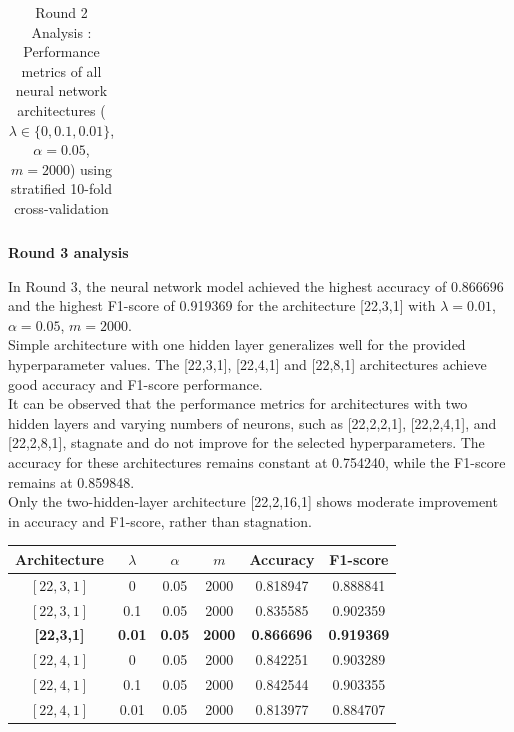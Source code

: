 \documentclass{article}
\begin{document}
\begin{enumerate}
\begin{table}[H]
\begin{tabular}{|c|c|c|c|c|c|}
\end{tabular}

\caption{Round 2 Analysis : Performance metrics of all neural network architectures ($\lambda \in \{0, 0.1, 0.01\}$, $\alpha = 0.05$, $m = 2000$) using stratified 10-fold cross-validation}
\end{table}



\textbf{Round 3 analysis}

In Round 3, the neural network model achieved the highest accuracy of 0.866696 and the highest F1-score of 0.919369 for the architecture [22,3,1] with $\lambda = 0.01$, $\alpha = 0.05$, $m = 2000$. \\

Simple architecture with one hidden layer generalizes well for the provided hyperparameter values. The [22,3,1], [22,4,1] and [22,8,1] architectures achieve good accuracy and F1-score performance.\\

It can be observed that the performance metrics for architectures with two hidden layers and varying numbers of neurons, such as [22,2,2,1], [22,2,4,1], and [22,2,8,1], stagnate and do not improve for the selected hyperparameters. The accuracy for these architectures remains constant at 0.754240, while the F1-score remains at 0.859848.\\

Only the two-hidden-layer architecture [22,2,16,1] shows moderate improvement in accuracy and F1-score, rather than stagnation.


\begin{table}[H]
\centering
\large
\renewcommand{\arraystretch}{1.2}
\setlength{\tabcolsep}{6pt}

\begin{tabular}{|c|c|c|c|c|c|}
\hline
\textbf{Architecture} & \textbf{$\lambda$} & \textbf{$\alpha$} & \textbf{$m$} & \textbf{Accuracy} & \textbf{F1-score} \\
\hline

$[22,3,1]$ & 0    & 0.05 & 2000 & 0.818947 & 0.888841 \\ \hline
$[22,3,1]$ & 0.1  & 0.05 & 2000 & 0.835585 & 0.902359 \\ \hline
\textbf{[22,3,1]} & \textbf{0.01} & \textbf{0.05} & \textbf{2000} & \textbf{0.866696} & \textbf{0.919369} \\ \hline

$[22,4,1]$ & 0    & 0.05 & 2000 & 0.842251 & 0.903289 \\ \hline
$[22,4,1]$ & 0.1  & 0.05 & 2000 & 0.842544 & 0.903355 \\ \hline
$[22,4,1]$ & 0.01 & 0.05 & 2000 & 0.813977 & 0.884707 \\ \hline


\end{tabular}
\end{table}
\end{enumerate}
\end{document}
